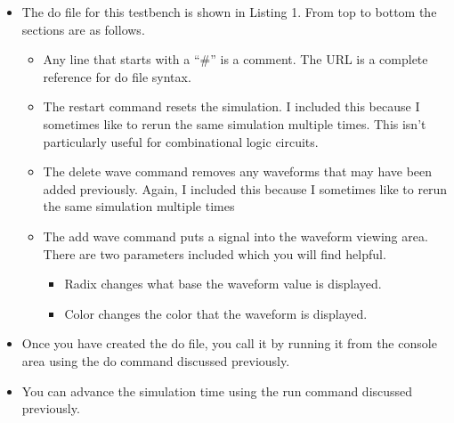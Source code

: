 \begin{itemize}
\item
  The do file for this testbench is shown in Listing 1. From top to
  bottom the sections are as follows.

  \begin{itemize}
  \item
    Any line that starts with a ``\#'' is a comment. The URL is a
    complete reference for do file syntax.
  \item
    The restart command resets the simulation. I included this because I
    sometimes like to rerun the same simulation multiple times. This
    isn't particularly useful for combinational logic circuits.
  \item
    The delete wave command removes any waveforms that may have been
    added previously. Again, I included this because I sometimes like to
    rerun the same simulation multiple times
  \item
    The add wave command puts a signal into the waveform viewing area.
    There are two parameters included which you will find helpful.

    \begin{itemize}
    \item
      Radix changes what base the waveform value is displayed.
    \item
      Color changes the color that the waveform is displayed.
    \end{itemize}
  \end{itemize}
\item
  Once you have created the do file, you call it by running it from the
  console area using the do command discussed previously.
\item
  You can advance the simulation time using the run command discussed
  previously.
\end{itemize}


